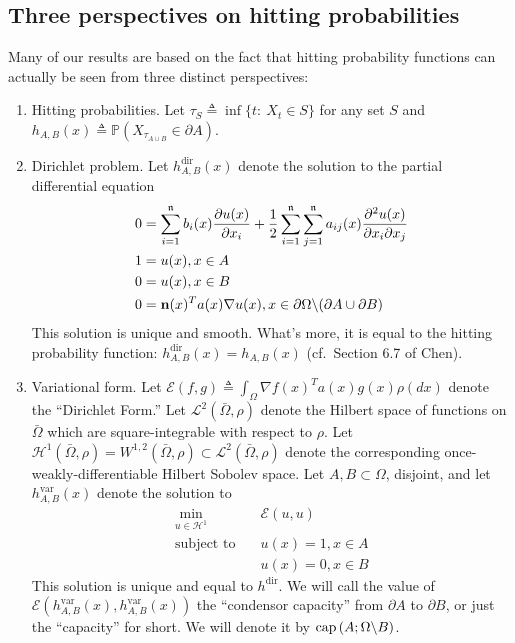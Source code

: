 \documentclass[english, aip, jcp, priprint, graphicx,floatfix]{revtex4-1}
\theoremstyle{plain}
\theoremstyle{definition}
\theoremstyle{plain}
\begin{document}
\subsection{Three perspectives on hitting probabilities}

Many of our results are based on the fact that hitting probability functions can actually be seen from three distinct perspectives:

\begin{enumerate}
    \item Hitting probabilities.  Let $\tau_S \triangleq \inf\{t:\ X_t \in S\}$ for any set $S$ and $h_{A,B}(x) \triangleq \mathbb{P}(X_{\tau_{A\cup B}}\in \partial A)$.
    
    \item Dirichlet problem.  Let $h^\mathrm{dir}_{A,B}(x)$ denote the solution to the partial differential equation
    \begin{align*}
    0 &= \sum_{i = 1}^{\mathfrak{n}} b_i (x) \frac{\partial u
        (x)}{\partial x_i} + \frac{1}{2} \sum_{i = 1}^{\mathfrak{n}} \sum_{j = 1}^{\mathfrak{n}} a_{ij} (x)
        \frac{\partial^2 u (x)}{\partial x_i \partial x_j}\\
    1 &= u(x),x\in A \\
    0 &= u(x) ,x\in B \\
    0 &= \mathbf{n}(x)^Ta(x)\nabla u(x), x \in \partial{\Omega} \backslash (\partial A \cup \partial B)
    \end{align*}
    This solution is unique and smooth.\cite{lieberman1986mixed}  What's more, it is equal to the hitting probability function: $h^\mathrm{dir}_{A,B}(x)=h_{A,B}(x)$ (cf.\ Section 6.7 of Chen\cite{chen2012symmetric}).

    \item Variational form.  Let $\mathscr{E}(f,g)\triangleq \int_\Omega \nabla f(x)^T a(x) g(x) \rho(dx)$ denote the ``Dirichlet Form.''  Let $\mathscr L^2(\bar \Omega,\rho)$ denote the Hilbert space of functions on $\bar \Omega$ which are square-integrable with respect to $\rho$.  Let $\mathcal{H}^1(\bar \Omega,\rho)=W^{1,2}(\bar \Omega,\rho) \subset \mathscr{L}^2(\bar \Omega,\rho)$ denote the corresponding once-weakly-differentiable Hilbert Sobolev space.  Let $A,B\subset \Omega$, disjoint, and let $h^\mathrm{var}_{A,B}(x)$ denote the solution to 
    \begin{align*}
    \min_{u \in \mathcal H^1} \quad & \mathscr{E}(u,u) \\
    \mbox{subject to} \quad & u(x)=1,x\in A \\
     & u(x)=0,x\in B
    \end{align*}
    This solution is unique and equal to $h^\mathrm{dir}$.\cite{karatson2005discrete}  We will call the value of $\mathscr{E}(h^\mathrm{var}_{A,B}(x),h^\mathrm{var}_{A,B}(x))$ the ``condensor capacity'' from $\partial A$ to $\partial B$, or just the ``capacity'' for short.  We will denote it by $\mathrm{cap}\left(A;\Omega \backslash B\right)$.
\end{enumerate}
\end{document}
